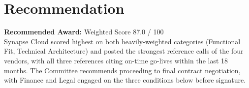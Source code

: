 \section{Recommendation}

\begin{tcolorbox}[colback=lightbg, colframe=goodgreen, arc=3pt, boxrule=1pt,
  left=12pt, right=12pt, top=8pt, bottom=8pt]
  \textbf{\color{goodgreen}\large Recommended Award: }
  \hfill \textcolor{mutedtext}{\small Weighted Score 87.0 / 100}\\[4pt]
  \small Synapse Cloud scored highest on both heavily-weighted categories (Functional Fit,
  Technical Architecture) and posted the strongest reference calls of the four vendors, with
  all three references citing on-time go-lives within the last 18 months. The Committee
  recommends proceeding to final contract negotiation, with Finance and Legal engaged on the
  three conditions below before signature.
\end{tcolorbox}

\vspace{6pt}

